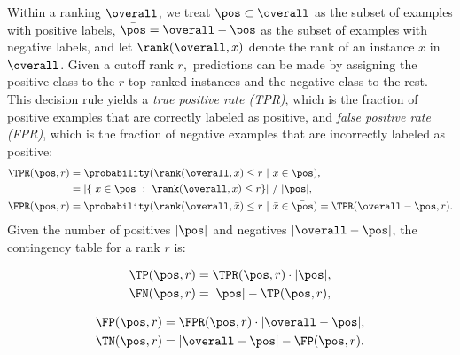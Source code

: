Within a ranking $\overall$, we treat $\pos \subset \overall$ as the subset of examples with positive labels, $\bar{\pos} = \overall - \pos$  as the subset of examples with negative labels, and let $\rank(\overall, x)$ denote the rank of an instance $x$ in $\overall$.  Given a cutoff rank $r,$ predictions can be made by assigning the positive class to the $r$ top ranked instances and the negative class to the rest. This decision rule yields a \emph{true positive rate (TPR)}, which is the fraction of positive examples that are correctly labeled as positive, and \emph{false positive rate (FPR)}, which is the fraction of negative examples that are incorrectly labeled as positive:
\begin{align}
\TPR(\pos, r) &= \probability(\rank(\overall, x) \leq r\ |\ x \in \pos), \nonumber \\
	      &= |\{\ x \in \pos\ :\ \rank(\overall, x) \leq r\}|\ /\ |\pos|, \label{tpr-def} \\
\FPR(\pos, r) &= \probability(\rank(\overall, \bar{x}) \leq r\ |\ \bar{x} \in \bar{\pos}) = \TPR(\overall - \pos, r). \label{fpr-def}
\end{align}
\noindent Given the number of positives $|\pos|$ and negatives $|\overall-\pos|$, the contingency table for a rank $r$ is: \\
\begin{minipage}[c]{0.45\textwidth}
\begin{align}
\TP(\pos,r) &= \TPR(\pos, r) \cdot |\pos|, \label{tp-def} \\
\FN(\pos,r) &= |\pos| - \TP(\pos, r), 
\end{align}
\end{minipage}\hfill\begin{minipage}[c]{0.52\textwidth}
\begin{align}
\FP(\pos,r) &= \FPR(\pos, r) \cdot |\overall-\pos|, \nonumber \\
\TN(\pos,r) &= |\overall-\pos| - \FP(\pos,r). %
\end{align}
\end{minipage}

